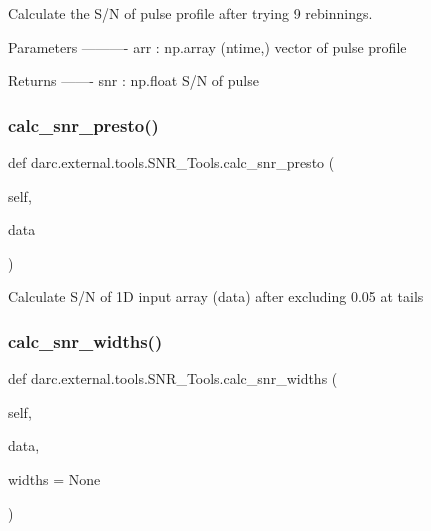 \begin{DoxyVerb}Calculate the S/N of pulse profile after 
trying 9 rebinnings.

Parameters
----------
arr   : np.array
    (ntime,) vector of pulse profile 

Returns
-------
snr : np.float 
    S/N of pulse
\end{DoxyVerb}
 \mbox{\label{classdarc_1_1external_1_1tools_1_1_s_n_r___tools_a43bc80cfc5246e566f10e35753b34c1e}} 
\subsubsection{\texorpdfstring{calc\_snr\_presto()}{calc\_snr\_presto()}}
{\footnotesize\ttfamily def darc.\+external.\+tools.\+S\+N\+R\+\_\+\+Tools.\+calc\+\_\+snr\+\_\+presto (\begin{DoxyParamCaption}\item[{}]{self,  }\item[{}]{data }\end{DoxyParamCaption})}

\begin{DoxyVerb}Calculate S/N of 1D input array (data)
after excluding 0.05 at tails
\end{DoxyVerb}
 \mbox{\label{classdarc_1_1external_1_1tools_1_1_s_n_r___tools_a1bc0ca3b5fbb0f53f6af672622507687}} 
\subsubsection{\texorpdfstring{calc\_snr\_widths()}{calc\_snr\_widths()}}
{\footnotesize\ttfamily def darc.\+external.\+tools.\+S\+N\+R\+\_\+\+Tools.\+calc\+\_\+snr\+\_\+widths (\begin{DoxyParamCaption}\item[{}]{self,  }\item[{}]{data,  }\item[{}]{widths = {\ttfamily None} }\end{DoxyParamCaption})}

